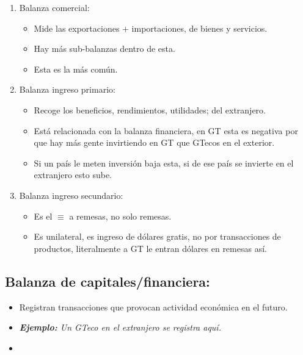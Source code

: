 \begin{enumerate}
    \item Balanza comercial:
        \begin{itemize}
            \item Mide las exportaciones + importaciones, de bienes y servicios.
            \item Hay más sub-balanzas dentro de esta.
            \item Esta es la más común.
        \end{itemize}
    
    \item Balanza ingreso primario:
        \begin{itemize}
            \item Recoge los beneficios, rendimientos, utilidades; del extranjero. 
            \item Está relacionada con la balanza financiera, en GT esta es negativa por que hay más gente invirtiendo en GT que GTecos en el exterior.
            \item Si un país le meten inversión baja esta, si de ese país se invierte en el extranjero esto sube.
        \end{itemize}
    
    \item Balanza ingreso secundario:
        \begin{itemize}
            \item Es el $\equiv$ a remesas, no solo remesas.
            \item Es unilateral, es ingreso de dólares gratis, no por transacciones de productos, literalmente a GT le entran dólares en remesas así.
        \end{itemize}
\end{enumerate}

\subsection{Balanza de capitales/financiera:}
\begin{itemize}
    \item Registran transacciones que provocan actividad económica en el futuro.
    \item \emph{\textbf{Ejemplo: }Un GTeco en el extranjero se registra aquí.}
    \item 
\end{itemize}

